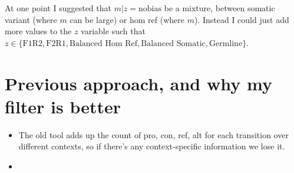 \documentclass[a4paper]{article}
\begin{document}
At one point I suggested that $m|z = \mathrm{no bias}$ be a mixture, between somatic variant (where $m$ can be large) or hom ref (where $m$). Instead I could just add more values to the $z$ variable such that $z \in \{ \text{F1R2}, \text{F2R1}, \text{Balanced Hom Ref}, \text{Balanced Somatic}, \text{Germline} \}$.

\section{Previous approach, and why my filter is better}
\begin{itemize}
\item The old tool adds up the count of pro, con, ref, alt for each transition over different contexts, so if there's any context-specific information we lose it.
\item 
\end{itemize}
\end{document}
